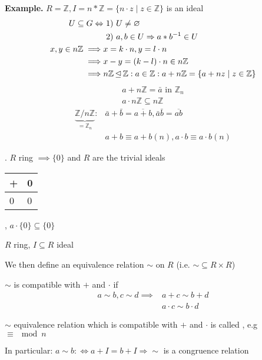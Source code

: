 \textbf{Example.}
$R = \mathbb{Z}, I = n*\mathbb{Z} = \{n \cdot z \mid z \in \mathbb{Z}\}$ is an ideal
\begin{align*}
  U \subseteq G \Leftrightarrow & ~1)~ U \neq \varnothing\\
                                & ~2)~ a,b \in U \Rightarrow a*b^{-1} \in U\\
  x,y \in n\mathbb{Z} \implies  & x = k\cdot n, y = l\cdot n\\
                      \implies  & x -y = (k-l) \cdot n \in n\mathbb{Z}\\
                      \implies  & n\mathbb{Z} \operatorname{\trianglelefteq} \mathbb{Z}:
                                  a \in \mathbb{Z} : a+n\mathbb{Z} =
                                  \{ a+nz \mid z\in \mathbb{Z} \}
\end{align*}
\begin{align*}
  a+n\mathbb{Z} = \bar{a} \text{ in } \mathbb{Z}_n \\
  a \cdot n \mathbb{Z} \subseteq n \mathbb{Z}
\end{align*}
\begin{align*}
  \underbrace{\mathbb{Z} / n \mathbb{Z}}_{=\mathbb{Z}_n}:
    & \bar{a} + \bar{b} = \overline{a+b}, \bar{a} \bar{b} = \overline{ab} \\
    & a+b \equiv a+b (n), a\cdot b \equiv a\cdot b (n)
\end{align*}

\Remark.
$R$ ring $\implies \{0\}$ and $R$ are the trivial ideals

\begin{tabular}{l|l}
+ & 0 \\
\hline
0 & 0
\end{tabular}
, $a \cdot \{0\} \subseteq \{0\}$

\begin{definition}
  $R$ ring, $I \subseteq R$ ideal

  We then define an equivalence relation $\sim$ on $R$ (i.e. $\sim \subseteq R \times R$)

  $\sim$ is compatible with $+$ and $\cdot$ if
  \begin{align*}
    a \sim b, c \sim d \implies & a +c \sim b+d \\
                                & a \cdot c \sim b \cdot d
  \end{align*}

  $\sim$ equivalence relation which is compatible with $+$ and $\cdot$
  is called , e.g $\equiv \mod n$

  In particular: $a\sim b :\Leftrightarrow a + I = b + I \Rightarrow \sim$ is a congruence relation
\end{definition}

